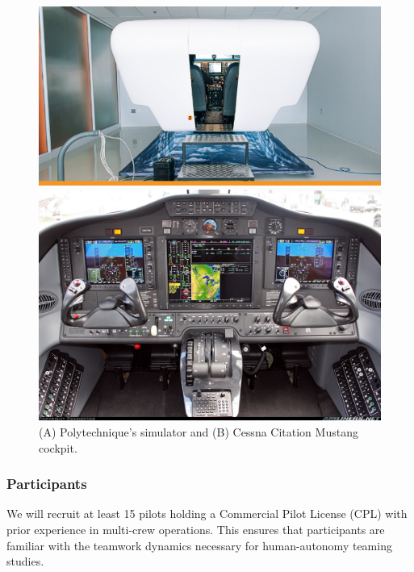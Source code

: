\documentclass[12pt,a4paper]{article} %
\begin{document}
	\begin{figure}[H]
		\centering
		\begin{minipage}[b]{0.50\textwidth} %
			\centering
			\includegraphics[width=\textwidth]{images/poly_simu.png}
		\end{minipage}
		\hfill %
		\begin{minipage}[b]{0.45\textwidth} %
			\centering
			\includegraphics[width=\textwidth]{images/mustang_cockpit.jpg}
		\end{minipage}
		\caption{(A) Polytechnique's simulator and (B) Cessna Citation Mustang cockpit.}
		\label{fig:simu_cockpit}
	\end{figure}
	

	\subsubsection{Participants}
	We will recruit at least 15 pilots holding a Commercial Pilot License (CPL) with prior experience in multi-crew operations. This ensures that participants are familiar with the teamwork dynamics necessary for human-autonomy teaming studies.
\end{document}
